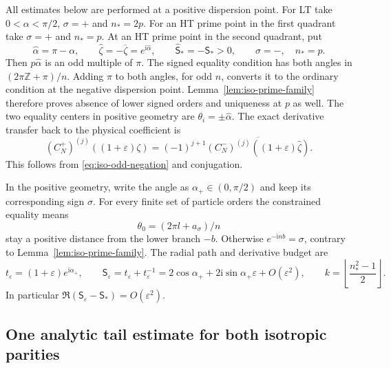 \documentclass[11pt]{article}
\numberwithin{equation}{section}
\theoremstyle{definition}
\newcommand{\Z}{\mathbb Z}
\newcommand{\ii}{\mathrm i}
\newcommand{\eps}{\varepsilon}
\begin{document}
All estimates below are performed at a positive dispersion point.
For LT take $0<\alpha<\pi/2$, $\sigma=+$ and $n_*=2p$.
For an HT prime point in the first quadrant take
$\sigma=+$ and $n_*=p$.  At an HT prime point in the second quadrant,
put
\begin{equation}\label{eq:iso-negative-geometry}
 \widehat\alpha=\pi-\alpha,\qquad
 \widehat\zeta=-\overline\zeta=e^{\ii\widehat\alpha},\qquad
 \widehat{\mathsf S}_*=-\mathsf S_*>0,
 \qquad \sigma=-,\quad n_*=p.
\end{equation}
Then $p\widehat\alpha$ is an odd multiple of $\pi$.
The signed equality condition has both angles in
$(2\pi\Z+\pi)/n$.  Adding $\pi$ to both angles, for odd $n$,
converts it to the ordinary condition at the negative dispersion
point.  Lemma~\ref{lem:iso-prime-family} therefore proves absence of
lower signed orders and uniqueness at $p$ as well.  The two equality
centers in positive geometry are $\theta_i=\pm\widehat\alpha$.
The exact derivative transfer back to the physical coefficient is
\begin{equation}\label{eq:iso-negative-jets}
 (C_N^+)^{(j)}((1+\eps)\zeta)
  =(-1)^{j+1}
      \overline{(C_N^-)^{(j)}((1+\eps)\widehat\zeta)}.
\end{equation}
This follows from \eqref{eq:iso-odd-negation} and conjugation.

In the positive geometry, write the angle as $\alpha_+\in(0,\pi/2)$
and keep its corresponding sign $\sigma$.
For every finite set of particle orders the constrained equality means
\[
 \theta_0=(2\pi l+a_\sigma)/n
\]
stay a positive distance from the lower branch $-b$.
Otherwise $e^{-\ii nb}=\sigma$, contrary to
Lemma~\ref{lem:iso-prime-family}.
The radial path and derivative budget are
\begin{equation}\label{eq:iso-budget}
 t_\eps=(1+\eps)e^{\ii\alpha_+},\qquad
 \mathsf S_\eps=t_\eps+t_\eps^{-1}
 =2\cos\alpha_++2\ii\sin\alpha_+\eps+O(\eps^2),
 \qquad
 k=\left\lfloor\frac{n_*^2-1}{2}\right\rfloor.
\end{equation}
In particular $\Re(\mathsf S_\eps-\mathsf S_*)=O(\eps^2)$.

\subsection{One analytic tail estimate for both isotropic parities}
\label{sec:iso-shared-tail}
\end{document}
